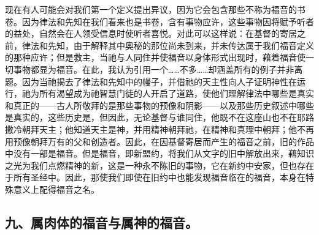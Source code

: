 现在有人可能会对我们第一个定义提出异议，因为它会包含那些不称为福音的书卷。因为律法和先知在我们看来也是书卷，含有事物应许，这些事物因将赋予听者的益处，自然会在人领受信息时使听者喜悦。对此可以这样说：在基督的寄居之前，律法和先知，由于解释其中奥秘的那位尚未到来，并未传达属于我们福音定义的那种应许；但是救主，当祂与人同住并使福音以身体形式出现时，藉着福音使一切事物都显为福音。在此，我认为引用一个……不多……却涵盖所有的例子并非离题。因为当祂揭去了律法和先知中的幔子，并借祂的天主性向人子证明神性在运行，祂为所有渴望成为祂智慧门徒的人开启了道路，使他们理解律法中哪些是真实和真正的——古人所敬拜的是那些事物的预像和阴影——以及那些历史叙述中哪些是真实的，这些历史是，但因此，无论基督与谁同住，他既不在这座山也不在耶路撒冷朝拜天主；他知道天主是神，并用精神朝拜祂，在精神和真理中朝拜；他不再用预像朝拜万有的父和创造者。因此，在因基督寄居而产生的福音之前，旧的作品中没有一部是福音。但是福音，即新盟约，将我们从文字的旧中解放出来，藉知识之光为我们点燃精神的新，这是一种永不陈旧的事物，它在新约中安家，但也存在于所有圣经中。因此，那使我们即使在旧约中也能发现福音临在的福音，本身在特殊意义上配得福音之名。\par


\subsection{九、属肉体的福音与属神的福音。}

